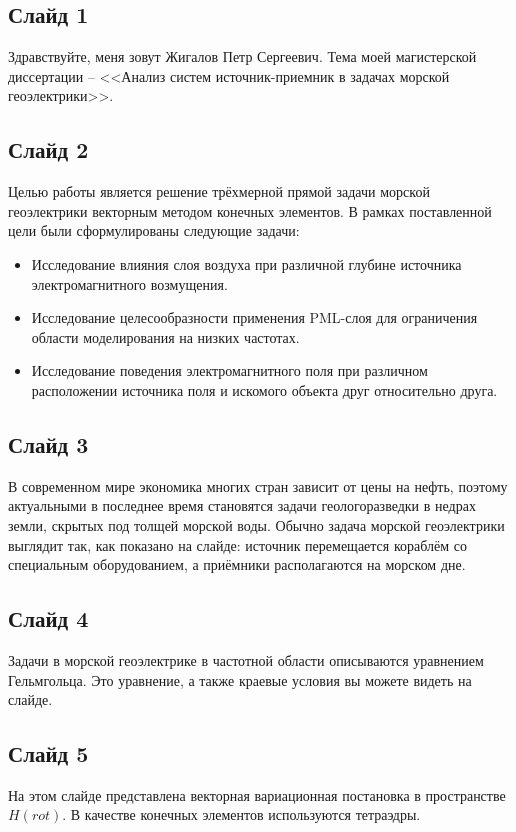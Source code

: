 \documentclass[a4paper,10pt]{article}
\begin{document}
\subsection*{Слайд 1}
Здравствуйте, меня зовут Жигалов Петр Сергеевич. Тема моей магистерской диссертации -- <<Анализ систем источник-приемник в задачах морской геоэлектрики>>.

\subsection*{Слайд 2}
Целью работы является решение трёхмерной прямой задачи морской геоэлектрики векторным методом конечных элементов. В рамках поставленной цели были сформулированы следующие задачи:
\begin{itemize}
	\item Исследование влияния слоя воздуха при различной глубине источника электромагнитного возмущения.
	\item Исследование целесообразности применения PML-слоя для ограничения области моделирования на низких частотах.
	\item Исследование поведения электромагнитного поля при различном расположении источника поля и искомого объекта друг относительно друга.
\end{itemize}

\subsection*{Слайд 3}
В современном мире экономика многих стран зависит от цены на нефть, поэтому актуальными в последнее время становятся задачи геологоразведки в недрах земли, скрытых под толщей морской воды. Обычно задача морской геоэлектрики выглядит так, как показано на слайде: источник перемещается кораблём со специальным оборудованием, а приёмники располагаются на морском дне.

\subsection*{Слайд 4}
Задачи в морской геоэлектрике в частотной области описываются уравнением Гельмгольца. Это уравнение, а также краевые условия вы можете видеть на слайде.

\subsection*{Слайд 5}
На этом слайде представлена векторная вариационная постановка в пространстве $H(rot)$. В качестве конечных элементов используются тетраэдры.
\end{document}
